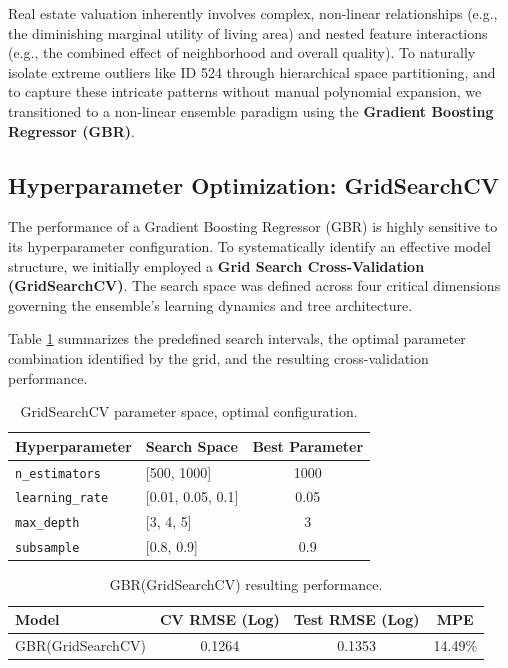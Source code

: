 \documentclass[11pt]{article}
\begin{document}
Real estate valuation inherently involves complex, non-linear relationships (e.g., the diminishing marginal utility of living area) and nested feature interactions (e.g., the combined effect of neighborhood and overall quality). To naturally isolate extreme outliers like ID 524 through hierarchical space partitioning, and to capture these intricate patterns without manual polynomial expansion, we transitioned to a non-linear ensemble paradigm using the \textbf{Gradient Boosting Regressor (GBR)}.
\subsection{Hyperparameter Optimization: GridSearchCV}

The performance of a Gradient Boosting Regressor (GBR) is highly sensitive to its hyperparameter configuration. To systematically identify an effective model structure, we initially employed a \textbf{Grid Search Cross-Validation (GridSearchCV)}. The search space was defined across four critical dimensions governing the ensemble's learning dynamics and tree architecture. 

\vspace{0.5em}
\noindent Table \ref{tab:grid_search} summarizes the predefined search intervals, the optimal parameter combination identified by the grid, and the resulting cross-validation performance.

\begin{table}[H]
    \centering
    \renewcommand{\arraystretch}{1.2}
    \begin{tabular}{llc}
        \toprule
        \textbf{Hyperparameter} & \textbf{Search Space} & \textbf{Best Parameter} \\
        \midrule
        \texttt{n\_estimators} & [500, 1000] & 1000 \\
        \texttt{learning\_rate} & [0.01, 0.05, 0.1] & 0.05 \\
        \texttt{max\_depth}    & [3, 4, 5] & 3 \\
        \texttt{subsample}     & [0.8, 0.9] & 0.9 \\
        \bottomrule 
    \end{tabular}
    \caption{GridSearchCV parameter space, optimal configuration.}
    \label{tab:grid_search}
\end{table}

\begin{table}[H]
    \centering
    \renewcommand{\arraystretch}{1.2}
    \begin{tabular}{lccc}
        \toprule
        \textbf{Model} & \textbf{CV RMSE (Log)} & \textbf{Test RMSE (Log)} & \textbf{MPE} \\
        \midrule
        GBR(GridSearchCV) & 0.1264 & 0.1353 & 14.49\% \\
        \bottomrule
    \end{tabular}
    \caption{GBR(GridSearchCV) resulting performance.}
    \label{tab:GridSearchCV_model_performance}
\end{table}
\end{document}
